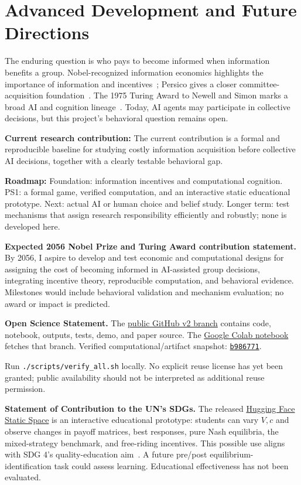\section{Advanced Development and Future Directions}
The enduring question is who pays to become informed when information benefits a group. Nobel-recognized information economics highlights the importance of information and incentives~\cite{nobel2001stiglitz}; Persico gives a closer committee-acquisition foundation~\cite{persico2004}. The 1975 Turing Award to Newell and Simon marks a broad AI and cognition lineage~\cite{acm1975newellsimon}. Today, AI agents may participate in collective decisions, but this project's behavioral question remains open.

\noindent\textbf{Current research contribution:} The current contribution is a formal and reproducible baseline for studying costly information acquisition before collective AI decisions, together with a clearly testable behavioral gap.

\noindent\textbf{Roadmap:} Foundation: information incentives and computational cognition. PS1: a formal game, verified computation, and an interactive static educational prototype. Next: actual AI or human choice and belief study. Longer term: test mechanisms that assign research responsibility efficiently and robustly; none is developed here.

\noindent\textbf{Expected 2056 Nobel Prize and Turing Award contribution statement.}
By 2056, I aspire to develop and test economic and computational designs for assigning the cost of becoming informed in AI-assisted group decisions, integrating incentive theory, reproducible computation, and behavioral evidence. Milestones would include behavioral validation and mechanism evaluation; no award or impact is predicted.

\noindent\textbf{Open Science Statement.}
The \href{https://github.com/micL1222/PS1-Yiqiao/tree/v2-information-acquisition}{public GitHub v2 branch} contains code, notebook, outputs, tests, demo, and paper source. The \href{https://colab.research.google.com/github/micL1222/PS1-Yiqiao/blob/v2-information-acquisition/notebooks/information_acquisition_baseline.ipynb}{Google Colab notebook} fetches that branch. Verified computational/artifact snapshot: \href{https://github.com/micL1222/PS1-Yiqiao/commit/b986771d1e79979825cd375c8ed663994bdc67ec}{\texttt{b986771}}.

Run \texttt{./scripts/verify\_all.sh} locally. No explicit reuse license has yet been granted; public availability should not be interpreted as additional reuse permission.

\noindent\textbf{Statement of Contribution to the UN's SDGs.}
The released \href{https://huggingface.co/spaces/dku-comsci-econ206-2026/who-pays-to-know}{Hugging Face Static Space} is an interactive educational prototype: students can vary \(V,c\) and observe changes in payoff matrices, best responses, pure Nash equilibria, the mixed-strategy benchmark, and free-riding incentives. This possible use aligns with SDG 4's quality-education aim~\cite{un_sdg4}. A future pre/post equilibrium-identification task could assess learning. Educational effectiveness has not been evaluated.
\label{main:end}
